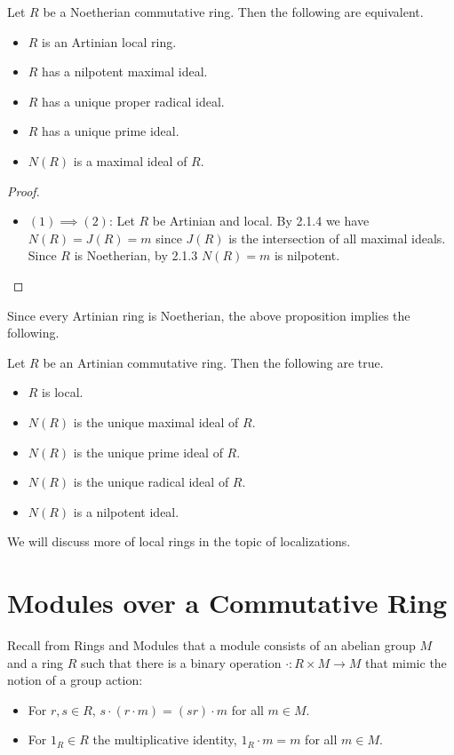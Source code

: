 \documentclass[a4paper]{article}
\begin{document}
\begin{prp}{}{} Let $R$ be a Noetherian commutative ring. Then the following are equivalent. 
\begin{itemize}
\item $R$ is an Artinian local ring. 
\item $R$ has a nilpotent maximal ideal. 
\item $R$ has a unique proper radical ideal. 
\item $R$ has a unique prime ideal. 
\item $N(R)$ is a maximal ideal of $R$. 
\end{itemize} \tcbline
\begin{proof}~\\
\begin{itemize}
\item $(1)\implies(2)$: Let $R$ be Artinian and local. By 2.1.4 we have $N(R)=J(R)=m$ since $J(R)$ is the intersection of all maximal ideals. Since $R$ is Noetherian, by 2.1.3 $N(R)=m$ is nilpotent. 
\end{itemize}
\end{proof}
\end{prp}

Since every Artinian ring is Noetherian, the above proposition implies the following. 

\begin{crl}{}{} Let $R$ be an Artinian commutative ring. Then the following are true. 
\begin{itemize}
\item $R$ is local. 
\item $N(R)$ is the unique maximal ideal of $R$. 
\item $N(R)$ is the unique prime ideal of $R$. 
\item $N(R)$ is the unique radical ideal of $R$. 
\item $N(R)$ is a nilpotent ideal. 
\end{itemize}
\end{crl}

We will discuss more of local rings in the topic of localizations. 

\pagebreak
\section{Modules over a Commutative Ring}
Recall from Rings and Modules that a module consists of an abelian group $M$ and a ring $R$ such that there is a binary operation $\cdot:R\times M\to M$ that mimic the notion of a group action: 
\begin{itemize}
\item For $r,s\in R$, $s\cdot(r\cdot m)=(sr)\cdot m$ for all $m\in M$. 
\item For $1_R\in R$ the multiplicative identity, $1_R\cdot m=m$ for all $m\in M$. 
\end{itemize}
\end{document}
